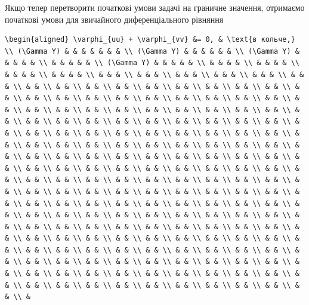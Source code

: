 \documentclass[
  ukrainian,
]{article}
\begin{document}
Якщо тепер перетворити початкові умови задачі на граничне значення,
отримаємо початкові умови для звичайного диференціального рівняння

\begin{verbatim}
\begin{aligned} \varphi_{uu} + \varphi_{vv} &= 0, & \text{в кольче,} \\ (\Gamma Y) & & & & & & & \\ (\Gamma Y) & & & & & & \\ (\Gamma Y) & & & & & \\ & & & & & \\ (\Gamma Y) & & & & & \\ & & & & \\ & & & & \\ & & & & \\ & & & & \\ & & & \\ & & & \\ & & & \\ & & & \\ & & & \\ & & & \\ & & \\ & & \\ & & \\ & & \\ & & \\ & & \\ & & \\ & & \\ & & \\ & & \\ & & \\ & & \\ & & \\ & & \\ & & \\ & & \\ & & \\ & & \\ & & \\ & & \\ & & \\ & & \\ & & \\ & & \\ & & \\ & & \\ & & \\ & & \\ & & \\ & & \\ & & \\ & & \\ & & \\ & & \\ & & \\ & & \\ & & \\ & & \\ & & \\ & & \\ & & \\ & & \\ & & \\ & & \\ & & \\ & & \\ & & \\ & & \\ & & \\ & & \\ & & \\ & & \\ & & \\ & & \\ & & \\ & & \\ & & \\ & & \\ & & \\ & & \\ & & \\ & & \\ & & \\ & & \\ & & \\ & & \\ & & \\ & & \\ & & \\ & & \\ & & \\ & & \\ & & \\ & & \\ & & \\ & & \\ & & \\ & & \\ & & \\ & & \\ & & \\ & & \\ & & \\ & & \\ & & \\ & & \\ & & \\ & & \\ & & \\ & & \\ & & \\ & & \\ & & \\ & & \\ & & \\ & & \\ & & \\ & & \\ & & \\ & & \\ & & \\ & & \\ & & \\ & & \\ & & \\ & & \\ & & \\ & & \\ & & \\ & & \\ & & \\ & & \\ & & \\ & & \\ & & \\ & & \\ & & \\ & & \\ & & \\ & & \\ & & \\ & & \\ & & \\ & & \\ & & \\ & & \\ & & \\ & & \\ & & \\ & & \\ & & \\ & & \\ & & \\ & & \\ & & \\ & & \\ & & \\ & & \\ & & \\ & & \\ & & \\ & & \\ & & \\ & & \\ & & \\ & & \\ & & \\ & & \\ & & \\ & & \\ & & \\ & & \\ & & \\ & & \\ & & \\ & & \\ & & \\ & & \\ & & \\ & & \\ & & \\ & & \\ & & \\ & & \\ & & \\ & & \\ & & \\ & & \\ & & \\ & & \\ & & \\ & & \\ & & \\ & & \\ & & \\ & & \\ & & \\ & & \\ & & \\ & & \\ & 
\end{verbatim}
\end{document}
